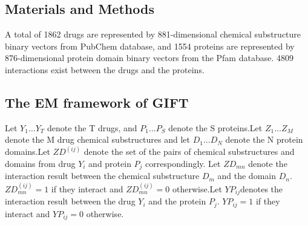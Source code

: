 \documentclass[a0,portrait]{a0poster}
\begin{document}
\begin{multicols}{2}

\color{DarkSlateGray} %

%
%


\section*{Materials and Methods}
 A total of 1862 drugs are represented by 881-dimensional chemical substructure binary vectors from PubChem database, and 1554 proteins are represented by 876-dimensional protein domain binary vectors from the Pfam database. 4809 interactions exist between the drugs and the proteins.


\subsection*{The EM framework of GIFT}


Let $Y_1\ldots Y_T$ denote the T drugs, and $P_1\ldots P_S$ denote the S proteins.Let $Z_1\ldots Z_M$ denote the M drug chemical substructures and let $D_1\ldots D_N$ denote the N protein domains.Let $ZD^{(ij)}$ denote the set of the pairs of chemical substructures and domains from drug $Y_i$ and protein $P_j$ correspondingly. Let $ZD_{mn}$ denote the interaction result between the chemical substructure $D_m$ and the domain $D_n$.$ZD^{(ij)}_{mn} = 1$ if they interact and $ZD^{(ij)}_{mn}=0$ otherwise.Let $YP_{ij}$denotes the interaction result between the drug $Y_i$ and the protein $P_j$. $YP_{ij}=1$ if they interact and $YP_{ij}=0$ otherwise.


\end{multicols}
\end{document}
